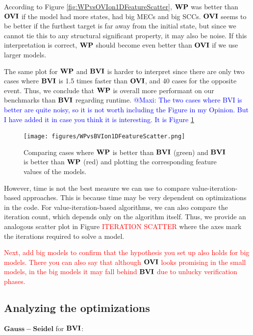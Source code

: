 According to Figure \ref{fig:WPvsOVIon1DFeatureScatter}, $\WP$ was better than $\mathbf{OVI}$ if the model had more states, had big MECs and big SCCs.
$\mathbf{OVI}$ seems to be better if the furthest target is far away from the initial state, but since we cannot tie this to any structural significant property,
it may also be noise. If this interpretation is correct, $\WP$ should become even better than $\mathbf{OVI}$ if we use larger models.

The same plot for $\WP$ and $\BVI$ is harder to interpret since there are only two cases where $\BVI$ is 1.5 times faster than $\mathbf{OVI}$, and 40 cases
for the opposite event. Thus, we conclude that $\WP$ is overall more performant on our benchmarks than $\BVI$ regarding runtime. 
\textcolor{blue}{@Maxi: The two cases where BVI is better are quite noisy, so it is not worth including the Figure in my Opinion.
But I have added it in case you think it is interesting. It is Figure \ref{fig:WPvsBVIon1DFeatureScatter}}

\begin{figure}[t]
    \centering
    \texttt{[image: figures/WPvsBVIon1DFeatureScatter.png]}
    \caption[$\WP$ compared to $\BVI$]{
        Comparing cases where $\WP$ is better than $\BVI$ (green) and $\BVI$ is better than $\WP$ (red) 
        and plotting the corresponding feature values of the models.
    }
    \label{fig:WPvsBVIon1DFeatureScatter}
\end{figure}


However, time is not the best measure we can use to compare value-iteration-based approaches. 
This is because time may be very dependent on optimizations in the code. 
For value-iteration-based algorithms, we can also compare the iteration count, which depends only on the algorithm itself.
Thus, we provide an analogous scatter plot in Figure \textcolor{red}{ITERATION SCATTER} where the axes mark the iterations required to solve a model.

\textcolor{red}{Next, add big models to confirm that the hypothesis you set up also holds for big models. 
There you can also say that although $\mathbf{OVI}$ looks promising in the small models, in the big models it may fall behind $\BVI$ due to unlucky verification phases.}

\subsection{Analyzing the optimizations}

$\mathbf{Gauss-Seidel}$ for $\BVI$:

